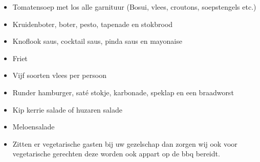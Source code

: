 \begin{itemize}
\item	Tomatensoep met los alle garnituur (Bosui, vlees, croutons, soepstengels etc.)
\item	Kruidenboter, boter, pesto, tapenade en stokbrood
\item	Knoflook saus, cocktail saus, pinda saus en mayonaise
\item	Friet
\item	Vijf soorten vlees per persoon
\item	Runder hamburger, saté stokje, karbonade, speklap en een braadworst
\item	Kip kerrie salade of huzaren salade
\item	Meloensalade
\item	Zitten er vegetarische gasten bij uw gezelschap dan zorgen wij ook voor vegetarische gerechten deze worden ook appart op de bbq bereidt.
\end{itemize}
